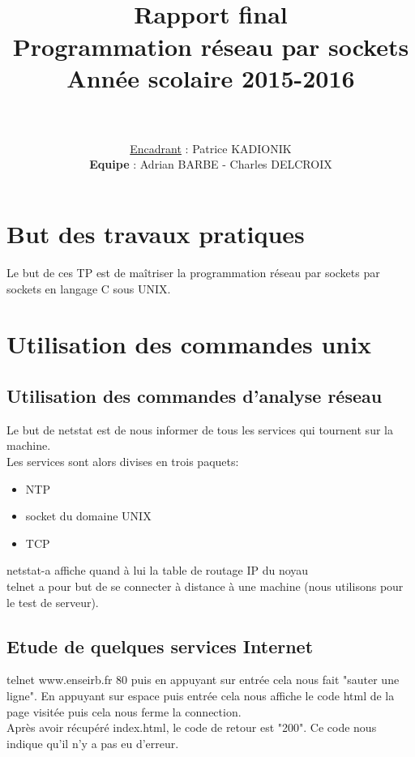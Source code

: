 \documentclass[paper=a4, fontsize=12pt]{article}
\title{
  \usefont{OT1}{bch}{b}{n}
  \horrule{1.5pt} \\[0.5cm]	
  \Huge \textbf{Rapport final} \\ [10pt]
  \Huge Programmation réseau par sockets \\ [15pt]
  \LARGE Année scolaire 2015-2016 \\ 
  \horrule{1.5pt} \\[0.5cm]
}
\author{
  \huge \underline{Encadrant} : \LARGE Patrice KADIONIK\\[20pt]
  \normalfont 							
  \huge \textbf{Equipe} : \Large Adrian BARBE - Charles DELCROIX \\[5pt]
  \normalsize
}
\date{}
\numberwithin{equation}{section}		%
\numberwithin{figure}{section}			%
\numberwithin{table}{section}				%
\begin{document}
\maketitle
\newpage

\tableofcontents

\newpage
\section{But des travaux pratiques}
Le but de ces TP est de maîtriser la programmation réseau par sockets par sockets en langage C sous UNIX.
\section{Utilisation des commandes unix}
\subsection{Utilisation des commandes d'analyse réseau}
Le but de netstat est de nous informer de tous les services qui tournent sur la machine.\\
Les services sont alors divises en trois paquets:
\begin{itemize}[label=$\square$,leftmargin=* ,parsep=0cm,itemsep=0cm,topsep=0cm]
\item NTP
\item socket du domaine UNIX 
\item TCP
\end{itemize}
netstat-a affiche quand à lui la table de routage IP du noyau
\\telnet a pour but de se connecter à distance à une machine (nous utilisons pour le test de serveur).
\subsection{Etude de quelques services Internet}
telnet www.enseirb.fr 80 puis en appuyant sur entrée cela nous fait "sauter une ligne". En appuyant sur espace puis entrée cela nous affiche le code html de la page visitée puis cela nous ferme la connection.
\\Après avoir récupéré index.html, le code de retour est "200". Ce code nous indique qu'il n'y a pas eu d'erreur.
\end{document}
